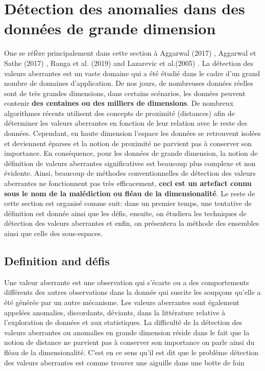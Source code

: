 \newpage
\newpage
\section{Détection des anomalies dans des données de grande dimension}
%
One se réfère principalement dans cette section  à Aggarwal (2017) \cite{A1}, Aggarwal et Sathe (2017) \cite{A8}, Ranga et al. (2019) \cite{A10} and Lazarevic et al.(2005) \cite{A14} .\newl 
La détection des valeurs aberrantes est un vaste domaine qui a été étudié dans le cadre d’un grand nombre de domaines d’application. De nos jours, de nombreuses données réelles sont de très grandes dimensions, dans certains scénarios, les données peuvent contenir \textbf{des centaines ou des milliers de dimensions}. De nombreux algorithmes récents utilisent des concepts de proximité (distances) afin de déterminer les valeurs aberrantes en fonction de leur relation avec le reste des données.  Cependant,  en haute dimension l’espace les données se retrouvent  isolées et deviennent éparses et la notion de proximité ne parvient pas à conserver son importance. En conséquence, pour les données de grande dimension, la notion de définition de valeurs aberrantes significatives est beaucoup plus complexe et non évidente.  Ainsi, beaucoup de  méthodes conventionnelles de  détection des valeurs aberrantes ne fonctionnent pas très efficacement, \textbf{ceci est un artefact connu sous le nom de  la malédiction ou fléau de la dimensionalité}. \newl
Le reste de cette section est organisé comme suit: dans un premier temps, une tentative de définition est donnée ainsi que les défis, ensuite, on étudiera les techniques de détection des valeurs aberrantes et enfin, on présentera la méthode des ensembles ainsi que celle des sous-espaces. 
%
%
\subsection{Definition and défis}
%
%
Une valeur aberrante est une observation qui s'écarte ou a des comportements différents des autres observations dans la donnée qui suscite les soupçons qu'elle a été générée par un autre
mécanisme. Les valeurs aberrantes sont également appelées anomalies, discordants, déviants,
dans la littérature relative à l'exploration de données et aux statistiques. \cite{A1}\newl
La difficulté de la détection des valeurs aberrantes ou anomalies en grande dimension réside dans le fait que la notion de distance ne parvient pas à conserver son importance on parle ainsi du fléau de la dimensionalité. C'est en ce sens qu'il est dit que le problème détection des valeurs aberrantes est comme trouver une aiguille dans une botte de foin \cite{A14}
%
